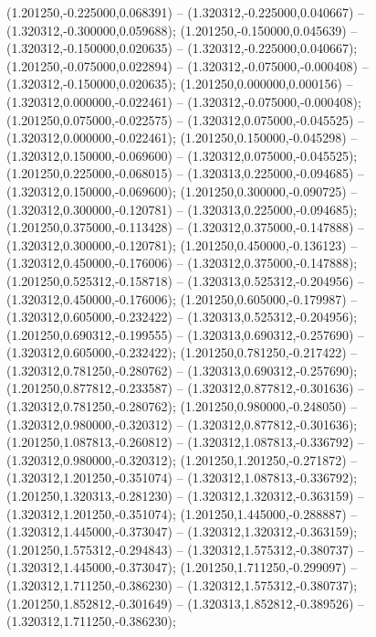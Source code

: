  (1.201250,-0.225000,0.068391) -- (1.320312,-0.225000,0.040667) -- (1.320312,-0.300000,0.059688);
 (1.201250,-0.150000,0.045639) -- (1.320312,-0.150000,0.020635) -- (1.320312,-0.225000,0.040667);
 (1.201250,-0.075000,0.022894) -- (1.320312,-0.075000,-0.000408) -- (1.320312,-0.150000,0.020635);
 (1.201250,0.000000,0.000156) -- (1.320312,0.000000,-0.022461) -- (1.320312,-0.075000,-0.000408);
 (1.201250,0.075000,-0.022575) -- (1.320312,0.075000,-0.045525) -- (1.320312,0.000000,-0.022461);
 (1.201250,0.150000,-0.045298) -- (1.320312,0.150000,-0.069600) -- (1.320312,0.075000,-0.045525);
 (1.201250,0.225000,-0.068015) -- (1.320313,0.225000,-0.094685) -- (1.320312,0.150000,-0.069600);
 (1.201250,0.300000,-0.090725) -- (1.320312,0.300000,-0.120781) -- (1.320313,0.225000,-0.094685);
 (1.201250,0.375000,-0.113428) -- (1.320312,0.375000,-0.147888) -- (1.320312,0.300000,-0.120781);
 (1.201250,0.450000,-0.136123) -- (1.320312,0.450000,-0.176006) -- (1.320312,0.375000,-0.147888);
 (1.201250,0.525312,-0.158718) -- (1.320313,0.525312,-0.204956) -- (1.320312,0.450000,-0.176006);
 (1.201250,0.605000,-0.179987) -- (1.320312,0.605000,-0.232422) -- (1.320313,0.525312,-0.204956);
 (1.201250,0.690312,-0.199555) -- (1.320313,0.690312,-0.257690) -- (1.320312,0.605000,-0.232422);
 (1.201250,0.781250,-0.217422) -- (1.320312,0.781250,-0.280762) -- (1.320313,0.690312,-0.257690);
 (1.201250,0.877812,-0.233587) -- (1.320312,0.877812,-0.301636) -- (1.320312,0.781250,-0.280762);
 (1.201250,0.980000,-0.248050) -- (1.320312,0.980000,-0.320312) -- (1.320312,0.877812,-0.301636);
 (1.201250,1.087813,-0.260812) -- (1.320312,1.087813,-0.336792) -- (1.320312,0.980000,-0.320312);
 (1.201250,1.201250,-0.271872) -- (1.320312,1.201250,-0.351074) -- (1.320312,1.087813,-0.336792);
 (1.201250,1.320313,-0.281230) -- (1.320312,1.320312,-0.363159) -- (1.320312,1.201250,-0.351074);
 (1.201250,1.445000,-0.288887) -- (1.320312,1.445000,-0.373047) -- (1.320312,1.320312,-0.363159);
 (1.201250,1.575312,-0.294843) -- (1.320312,1.575312,-0.380737) -- (1.320312,1.445000,-0.373047);
 (1.201250,1.711250,-0.299097) -- (1.320312,1.711250,-0.386230) -- (1.320312,1.575312,-0.380737);
 (1.201250,1.852812,-0.301649) -- (1.320313,1.852812,-0.389526) -- (1.320312,1.711250,-0.386230);
